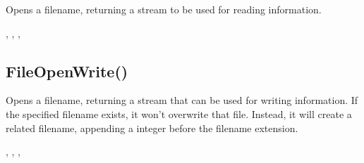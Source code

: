 \documentclass[letterpaper,10pt,english]{sphinxmanual}
\begin{document}
\sphinxAtStartPar
{}

\sphinxAtStartPar
Opens a filename, returning  a stream to be used                for reading information.

\sphinxAtStartPar
{}

\begin{sphinxVerbatim}[commandchars=\\\{\}]
\end{sphinxVerbatim}

\sphinxAtStartPar
{}

\sphinxAtStartPar
{}, , , 

\ignorespaces 

\subsection{FileOpenWrite()}
\label{\detokenize{reference/peblstream:fileopenwrite}}\label{\detokenize{reference/peblstream:index-13}}
\sphinxAtStartPar
{}

\sphinxAtStartPar
{}

\sphinxAtStartPar
Opens a filename, returning a stream that can be   used for writing information.  If the specified filename exists, it   won’t overwrite that file.  Instead, it will create a related   filename, appending a \sphinxhyphen{}integer before the filename extension.

\sphinxAtStartPar
{}

\begin{sphinxVerbatim}[commandchars=\\\{\}]
\end{sphinxVerbatim}

\sphinxAtStartPar
{}

\sphinxAtStartPar
{}, , , 
\end{document}
